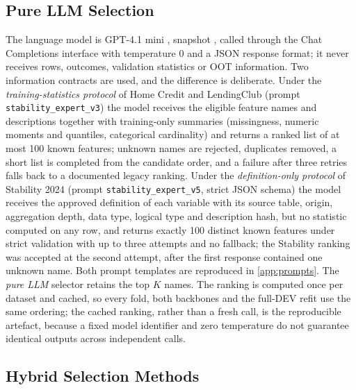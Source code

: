 \documentclass[final,5p,twocolumn]{elsarticle}
\newcommand{\Kfeat}{K}
\begin{document}
\subsection{Pure LLM Selection}
\label{subsec:llm_fs}

The language model is GPT-4.1 mini \cite{openai2025gpt41}, snapshot , called through the Chat Completions interface with temperature 0 and a JSON response format; it never receives rows, outcomes, validation statistics or OOT information. Two information contracts are used, and the difference is deliberate. Under the \emph{training-statistics protocol} of Home Credit and LendingClub (prompt \texttt{stability\_expert\_v3}) the model receives the eligible feature names and descriptions together with training-only summaries (missingness, numeric moments and quantiles, categorical cardinality) and returns a ranked list of at most 100 known features; unknown names are rejected, duplicates removed, a short list is completed from the candidate order, and a failure after three retries falls back to a documented legacy ranking. Under the \emph{definition-only protocol} of Stability 2024 (prompt \texttt{stability\_expert\_v5}, strict JSON schema) the model receives the approved definition of each variable with its source table, origin, aggregation depth, data type, logical type and description hash, but no statistic computed on any row, and returns exactly 100 distinct known features under strict validation with up to three attempts and no fallback; the Stability ranking was accepted at the second attempt, after the first response contained one unknown name. Both prompt templates are reproduced in \ref{app:prompts}. The \emph{pure LLM} selector retains the top $\Kfeat$ names. The ranking is computed once per dataset and cached, so every fold, both backbones and the full-DEV refit use the same ordering; the cached ranking, rather than a fresh call, is the reproducible artefact, because a fixed model identifier and zero temperature do not guarantee identical outputs across independent calls.

\subsection{Hybrid Selection Methods}
\label{subsec:hybrid_fs}
\end{document}
